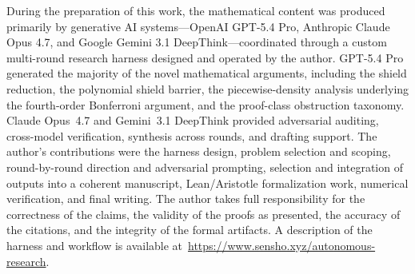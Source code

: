 \documentclass[11pt]{amsart}
\begin{document}
During the preparation of this work, the mathematical content was produced
primarily by generative AI systems---OpenAI GPT-5.4 Pro, Anthropic Claude
Opus 4.7, and Google Gemini 3.1 DeepThink---coordinated through a custom
multi-round research harness designed and operated by the author.  GPT-5.4 Pro
generated the majority of the novel mathematical arguments, including the
shield reduction, the polynomial shield barrier, the piecewise-density
analysis underlying the fourth-order Bonferroni argument, and the
proof-class obstruction taxonomy.  Claude Opus~4.7 and Gemini~3.1 DeepThink
provided adversarial auditing, cross-model verification, synthesis across
rounds, and drafting support.  The author's contributions were the harness
design, problem selection and scoping, round-by-round direction and
adversarial prompting, selection and integration of outputs into a coherent
manuscript, Lean/Aristotle formalization work, numerical verification, and
final writing.  The author takes full responsibility for the correctness of
the claims, the validity of the proofs as presented, the accuracy of the
citations, and the integrity of the formal artifacts.  A description of the
harness and workflow is available at~\url{https://www.sensho.xyz/autonomous-research}.



\end{document}
